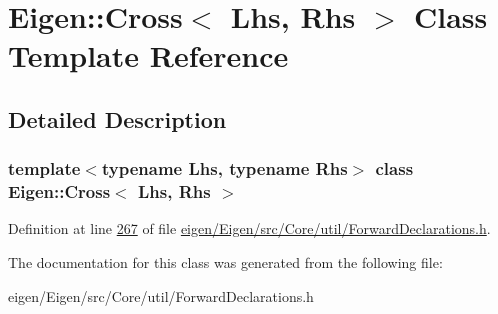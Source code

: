 \hypertarget{class_eigen_1_1_cross}{}\section{Eigen\+:\+:Cross$<$ Lhs, Rhs $>$ Class Template Reference}
\label{class_eigen_1_1_cross}


\subsection{Detailed Description}
\subsubsection*{template$<$typename Lhs, typename Rhs$>$\newline
class Eigen\+::\+Cross$<$ Lhs, Rhs $>$}



Definition at line \hyperlink{eigen_2_eigen_2src_2_core_2util_2_forward_declarations_8h_source_l00267}{267} of file \hyperlink{eigen_2_eigen_2src_2_core_2util_2_forward_declarations_8h_source}{eigen/\+Eigen/src/\+Core/util/\+Forward\+Declarations.\+h}.



The documentation for this class was generated from the following file\+:\begin{DoxyCompactItemize}
\item 
eigen/\+Eigen/src/\+Core/util/\+Forward\+Declarations.\+h\end{DoxyCompactItemize}
